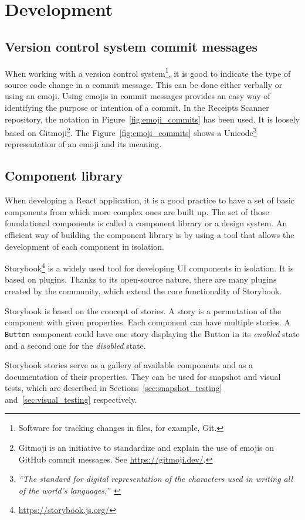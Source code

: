 \documentclass[
  digital, %
  table,   %
  oneside, %
  lof,     %
  lot,     %
]{fithesis3}
\begin{document}
\chapter{Development}
\section{Version control system commit messages}
When working with a version control system\footnote{Software for tracking changes in files, for example, Git.}, it is good to indicate the type of source code change in a commit message. This can be done either verbally or using an emoji.
Using emojis in commit messages provides an easy way of identifying the purpose or intention of a commit. In the Receipts Scanner repository, the notation in Figure~\ref{fig:emoji_commits} has been used. It is loosely based on Gitmoji\footnote{Gitmoji is an initiative to standardize and explain the use of emojis on GitHub commit messages. See \url{https://gitmoji.dev/}.}. The Figure~\ref{fig:emoji_commits} shows a Unicode\footnote{\textit{``The standard for digital representation of the characters used in writing all of the world's languages.''}~\cite{Unicode}} representation of an emoji and its meaning.

\section{Component library}
\label{sec:component_library}
When developing a React application, it is a good practice to have a set of basic components from which more complex ones are built up. The set of those foundational components is called a component library or a design system. An efficient way of building the component library is by using a tool that allows the development of each component in isolation. 

Storybook\footnote{\url{https://storybook.js.org/}} is a widely used tool for developing UI components in isolation. It is based on plugins. Thanks to its open-source nature, there are many plugins created by the community, which extend the core functionality of Storybook.

Storybook is based on the concept of stories. A story is a permutation of the component with given properties. Each component can have multiple stories. A \texttt{Button} component could have one story displaying the Button in its \textit{enabled} state and a second one for the \textit{disabled} state.

Storybook stories serve as a gallery of available components and as a documentation of their properties. They can be used for snapshot and visual tests, which are described in Sections~\ref{sec:snapshot_testing} and~\ref{sec:visual_testing} respectively.
\end{document}
